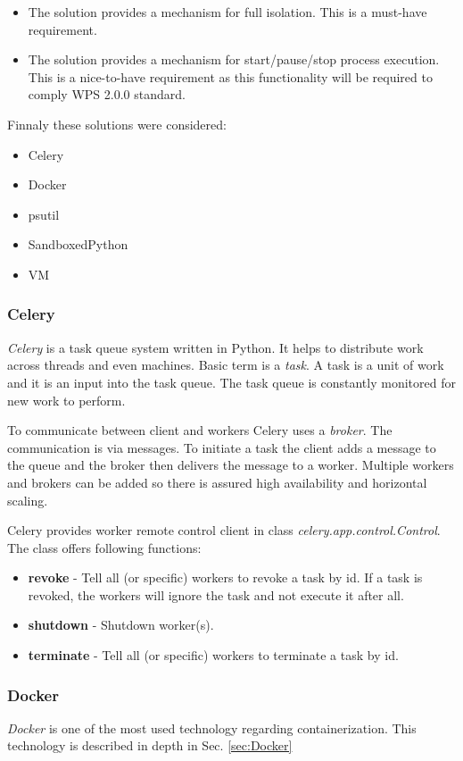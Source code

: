 \begin{itemize}
\item The solution provides a mechanism for full isolation. This is a must-have requirement.
\item The solution provides a mechanism for start/pause/stop process execution. This is a nice-to-have requirement as this functionality
will be required to comply WPS 2.0.0 standard.
\end{itemize}

\noindent
Finnaly these solutions were considered:
\begin{itemize}
\item Celery
\item Docker
\item psutil
\item SandboxedPython
\item VM
\end{itemize}

\subsubsection{Celery}
\textit{Celery} is a task queue system written in Python. It helps to distribute work across threads and even machines. Basic term is
a \textit{task}. A task is a unit of work and it is an input into the task queue. The task queue is constantly monitored for new 
work to perform.

To communicate between client and workers Celery uses a \textit{broker}. The communication is via messages. To initiate a task the
client adds a message to the queue and the broker then delivers the message to a worker. Multiple workers and brokers can be added
so there is assured high availability and horizontal scaling.

Celery provides worker remote control client in class
\textit{celery.app.control.Control}. The class offers following functions:
\begin{itemize}
\item\textbf{revoke} - Tell all (or specific) workers to revoke a task by id. If a task is revoked, the workers will ignore the task and not execute it after all.
\item\textbf{shutdown} - Shutdown worker(s).
\item\textbf{terminate} - Tell all (or specific) workers to terminate a task by id.
\end{itemize}

\subsubsection{Docker}
\textit{Docker} is one of the most used technology regarding containerization. This technology is described in depth in Sec. \ref{sec:Docker}

